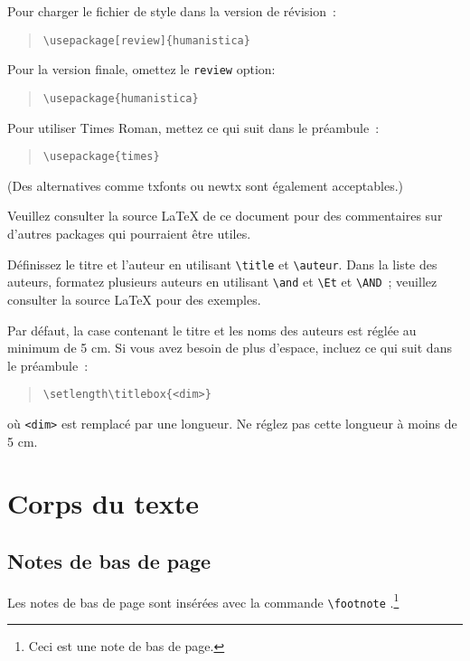 \documentclass[11pt,french,hyphens]{article}
\begin{document}
Pour charger le fichier de style dans la version de révision :
\begin{quote}
\begin{verbatim}
\usepackage[review]{humanistica}
\end{verbatim}
\end{quote}
Pour la version finale, omettez le \verb|review| option:
\begin{quote}
\begin{verbatim}
\usepackage{humanistica}
\end{verbatim}
\end{quote}

Pour utiliser Times Roman, mettez ce qui suit dans le préambule :
\begin{quote}
\begin{verbatim}
\usepackage{times}
\end{verbatim}
\end{quote}
(Des alternatives comme txfonts ou newtx sont également acceptables.)

Veuillez consulter la source \LaTeX{} de ce document pour des commentaires sur d'autres packages qui pourraient être utiles.

Définissez le titre et l'auteur en utilisant \verb|\title| et \verb|\auteur|. Dans la liste des auteurs, formatez plusieurs auteurs en utilisant \verb|\and| et \verb|\Et| et \verb|\AND| ; veuillez consulter la source \LaTeX{} pour des exemples.

Par défaut, la case contenant le titre et les noms des auteurs est réglée au minimum de 5 cm. Si vous avez besoin de plus d'espace, incluez ce qui suit dans le préambule :
\begin{quote}
\begin{verbatim}
\setlength\titlebox{<dim>}
\end{verbatim}
\end{quote}
où \verb|<dim>| est remplacé par une longueur. Ne réglez pas cette longueur à moins de 5 cm.

\section{Corps du texte}

\subsection{Notes de bas de page}

Les notes de bas de page sont insérées avec la commande \verb|\footnote| .\footnote{Ceci est une note de bas de page.}
\end{document}
